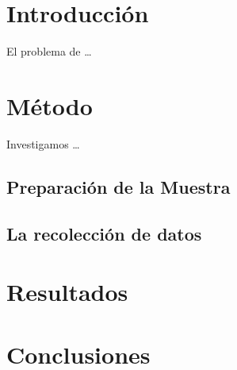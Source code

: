 \documentclass{article}
\begin{document}
\section{Introducci\'on}

El problema de \ldots

\section{M\'etodo}

Investigamos  \ldots

\subsection{Preparaci\'on de la Muestra}

\subsection{La recolecci\'on de datos}

\section{Resultados}

\section{Conclusiones}
\end{document}
